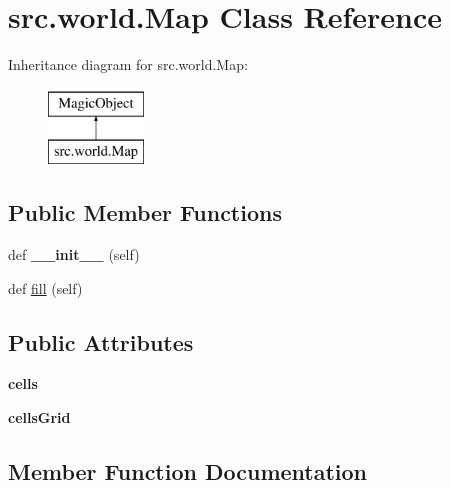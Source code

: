 \hypertarget{classsrc_1_1world_1_1_map}{}\section{src.\+world.\+Map Class Reference}
\label{classsrc_1_1world_1_1_map}
Inheritance diagram for src.\+world.\+Map\+:\begin{figure}[H]
\begin{center}
\leavevmode
\includegraphics[height=2.000000cm]{classsrc_1_1world_1_1_map}
\end{center}
\end{figure}
\subsection*{Public Member Functions}
\begin{DoxyCompactItemize}
\item 
\hypertarget{classsrc_1_1world_1_1_map_a1f6dd125a788f44dd49742d6f707a405}{}\label{classsrc_1_1world_1_1_map_a1f6dd125a788f44dd49742d6f707a405} 
def {\bfseries \+\_\+\+\_\+init\+\_\+\+\_\+} (self)
\item 
def \hyperlink{classsrc_1_1world_1_1_map_a51b781091e22b6f7da25a1d2c8628fac}{fill} (self)
\end{DoxyCompactItemize}
\subsection*{Public Attributes}
\begin{DoxyCompactItemize}
\item 
\hypertarget{classsrc_1_1world_1_1_map_ab2fe108b9dc974f92bec5f6b69fa6ba5}{}\label{classsrc_1_1world_1_1_map_ab2fe108b9dc974f92bec5f6b69fa6ba5} 
{\bfseries cells}
\item 
\hypertarget{classsrc_1_1world_1_1_map_a243f0764a8b20a4768bfb66c3f85a946}{}\label{classsrc_1_1world_1_1_map_a243f0764a8b20a4768bfb66c3f85a946} 
{\bfseries cells\+Grid}
\end{DoxyCompactItemize}


\subsection{Member Function Documentation}
\hypertarget{classsrc_1_1world_1_1_map_a51b781091e22b6f7da25a1d2c8628fac}{}\label{classsrc_1_1world_1_1_map_a51b781091e22b6f7da25a1d2c8628fac} 
